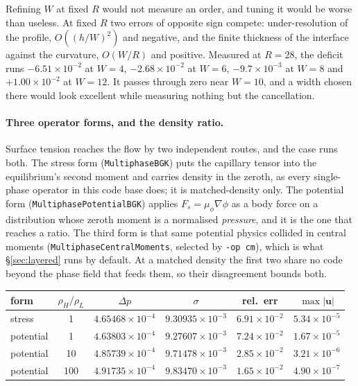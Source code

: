 \documentclass[11pt,a4paper]{article}
\newcommand{\code}[1]{\texttt{\small #1}}
\newcommand{\uu}{\bm{u}}
\newcommand{\e}[1]{\times 10^{#1}}
\begin{document}
Refining $W$ at fixed $R$ would not measure an order, and tuning it would be
worse than useless. At fixed $R$ two errors of opposite sign compete:
under-resolution of the profile, $O((h/W)^2)$ and negative, and the finite
thickness of the interface against the curvature, $O(W/R)$ and positive. Measured
at $R=28$, the deficit runs $-6.51\e{-2}$ at $W=4$, $-2.68\e{-2}$ at $W=6$,
$-9.7\e{-3}$ at $W=8$ and $+1.00\e{-2}$ at $W=12$. It passes through zero near
$W=10$, and a width chosen there would look excellent while measuring nothing but
the cancellation.

\paragraph{Three operator forms, and the density ratio.} Surface tension reaches
the flow by two independent routes, and the case runs both. The stress form
(\code{MultiphaseBGK}) puts the capillary tensor into the equilibrium's second
moment and carries density in the zeroth, as every single-phase operator in this
code base does; it is matched-density only. The potential form
(\code{MultiphasePotentialBGK}) applies $F_s = \mu_\phi\nabla\phi$ as a body force
on a distribution whose zeroth moment is a normalised \emph{pressure}, and it is
the one that reaches a ratio. The third form is that same potential physics
collided in central moments (\code{MultiphaseCentralMoments}, selected by
\code{-op cm}), which is what \S\ref{sec:layered} runs by default. At a matched
density the first two share no code beyond the phase field that feeds them, so
their disagreement bounds both.

\begin{center}\small
\begin{tabular}{lccccc}
\toprule
form & $\rho_H/\rho_L$ & $\Delta p$ & $\sigma$ & rel.\ err & $\max|\uu|$ \\
\midrule
stress    & 1   & $4.65468\e{-4}$ & $9.30935\e{-3}$ & $6.91\e{-2}$ & $5.34\e{-5}$ \\
potential & 1   & $4.63803\e{-4}$ & $9.27607\e{-3}$ & $7.24\e{-2}$ & $1.67\e{-5}$ \\
potential & 10  & $4.85739\e{-4}$ & $9.71478\e{-3}$ & $2.85\e{-2}$ & $3.21\e{-6}$ \\
potential & 100 & $4.91735\e{-4}$ & $9.83470\e{-3}$ & $1.65\e{-2}$ & $4.90\e{-7}$ \\
\bottomrule
\end{tabular}
\end{center}
\end{document}
